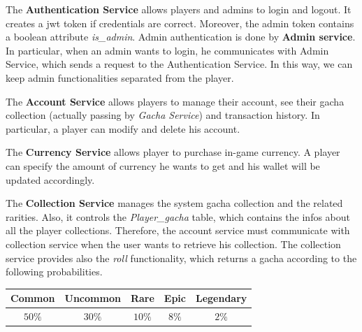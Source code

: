 \documentclass{article}
\begin{document}
The \textbf{Authentication Service} allows players and admins to login and logout. It creates a jwt token if credentials are correct. Moreover, the admin token contains a boolean attribute \emph{is\_admin}. Admin authentication is done by \textbf{Admin service}. In particular, when an admin wants to login, he communicates with Admin Service, which sends a request to the Authentication Service. In this way, we can keep admin functionalities separated from the player.

The \textbf{Account Service} allows players to manage their account, see their gacha collection (actually passing by \emph{Gacha Service}) and transaction history. In particular, a player can modify and delete his account.

The \textbf{Currency Service} allows player to purchase in-game currency. A player can specify the amount of currency he wants to get and his wallet will be updated accordingly.

The \textbf{Collection Service} manages the system gacha collection and the related rarities. Also, it controls the \emph{Player\_gacha} table, which contains the infos about all the player collections. Therefore, the account service must communicate with collection service when the user wants to retrieve his collection. The collection service provides also the \emph{roll} functionality, which returns a gacha according to the following probabilities.

\begin{table}[ht!]
    \centering
    \begin{tabular}{|c|c|c|c|c|}
        \hline
        \textbf{Common} & \textbf{Uncommon} & \textbf{Rare} & \textbf{Epic} & \textbf{Legendary} \\
        \hline
        $50\%$          & $30\%$            & $10\%$        & $8\%$         & $2\%$              \\
        \hline
    \end{tabular}
\end{table}

\end{document}
